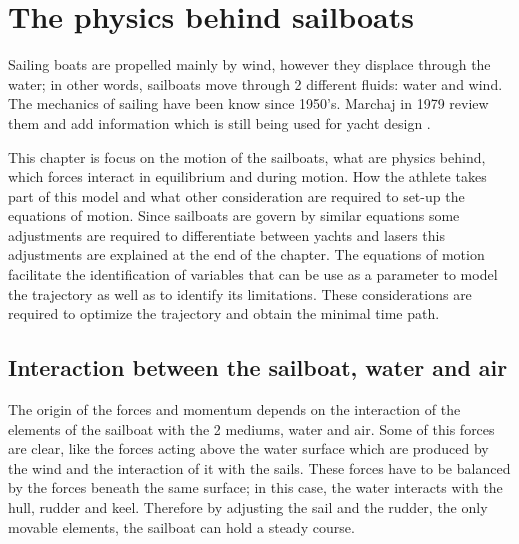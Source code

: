 \chapter{The physics behind sailboats}
Sailing boats are propelled mainly by wind, however they displace through the water; in other words, sailboats move through 2 different fluids: water and wind. The mechanics of sailing have been know since 1950's.  Marchaj in 1979 review them and add information which is still being used for yacht design \cite{marchajaereo1979}.\par 

This chapter is focus on the motion of the sailboats, what are physics behind, which forces interact in equilibrium and during motion. How the athlete takes part of this model and what other consideration are required to set-up the equations of motion. Since sailboats are govern by similar equations some adjustments are required to differentiate between yachts and lasers this adjustments are explained at the end of the chapter. The equations of motion facilitate the identification of variables that can be use as a parameter to model the trajectory as well as to identify its limitations. These considerations are required to optimize the trajectory and obtain the minimal time path. \par
\section{Interaction between the sailboat, water and air} \label{sec:interaction_boat_environ}
The origin of the forces and momentum depends on the interaction of the elements of the sailboat with the 2 mediums, water and air. Some of this forces are clear, like the forces acting above the water surface which are produced by the wind and the interaction of it with the sails. These forces have to be balanced by the forces beneath the same surface; in this case, the water interacts with the hull, rudder and keel. Therefore by adjusting the sail and the rudder, the only movable elements, the sailboat can hold a steady course.\par

